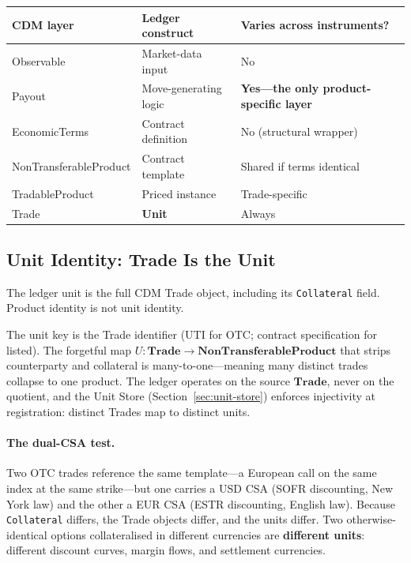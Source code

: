 \begin{center}\small
\begin{tabular}{lll}
\toprule
\textbf{CDM layer} & \textbf{Ledger construct} & \textbf{Varies across instruments?} \\
\midrule
Observable & Market-data input & No \\
Payout & Move-generating logic & \textbf{Yes---the only product-specific layer} \\
EconomicTerms & Contract definition & No (structural wrapper) \\
NonTransferableProduct & Contract template & Shared if terms identical \\
TradableProduct & Priced instance & Trade-specific \\
Trade & \textbf{Unit} & Always \\
\bottomrule
\end{tabular}
\end{center}

\subsection{Unit Identity: Trade Is the Unit}
\label{sec:cdm-trade}

\begin{principle}[Trade $=$ Unit]
The ledger unit is the full CDM Trade object, including its \texttt{Collateral} field. Product identity is not unit identity.
\end{principle}

The unit key is the Trade identifier (UTI for OTC; contract specification for listed). The forgetful map $U:\mathbf{Trade}\to\mathbf{NonTransferableProduct}$ that strips counterparty and collateral is many-to-one---meaning many distinct trades collapse to one product. The ledger operates on the source $\mathbf{Trade}$, never on the quotient, and the Unit Store (Section~\ref{sec:unit-store}) enforces injectivity at registration: distinct Trades map to distinct units.

\paragraph{The dual-CSA test.} Two OTC trades reference the same template---a European call on the same index at the same strike---but one carries a USD CSA (SOFR discounting, New York law) and the other a EUR CSA (ESTR discounting, English law). Because \texttt{Collateral} differs, the Trade objects differ, and the units differ. Two otherwise-identical options collateralised in different currencies are \textbf{different units}: different discount curves, margin flows, and settlement currencies.

